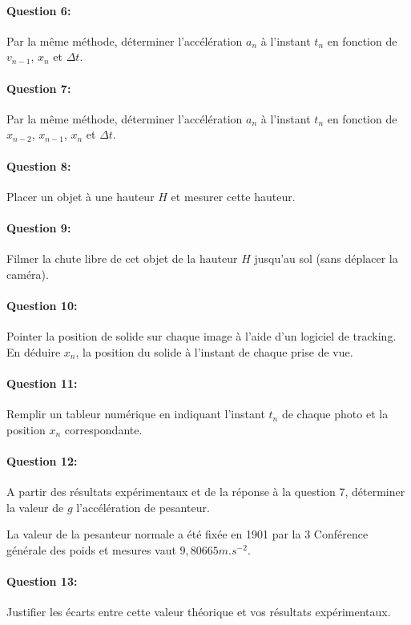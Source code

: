 \paragraph{Question 6:} Par la même méthode, déterminer l'accélération $a_n$ à l'instant $t_n$ en fonction de $v_{n-1}$, $x_n$ et $\Delta t$.

\paragraph{Question 7:} Par la même méthode, déterminer l'accélération $a_n$ à l'instant $t_n$ en fonction de $x_{n-2}$, $x_{n-1}$, $x_n$ et $\Delta t$.


\paragraph{Question 8:} Placer un objet à une hauteur $H$ et mesurer cette hauteur.

\paragraph{Question 9:} Filmer la chute libre de cet objet de la hauteur $H$ jusqu'au sol (sans déplacer la caméra).

\paragraph{Question 10:} Pointer la position de solide sur chaque image à l'aide d'un logiciel de tracking. En déduire $x_n$, la position du solide à l'instant de chaque prise de vue.

\paragraph{Question 11:} Remplir un tableur numérique en indiquant l'instant $t_n$ de chaque photo et la position $x_n$ correspondante.


\paragraph{Question 12:} A partir des résultats expérimentaux et de la réponse à la question 7, déterminer la valeur de $g$ l'accélération de pesanteur.

 La valeur de la pesanteur normale a été fixée en 1901 par la 3 Conférence générale des poids et mesures vaut $9,80665m.s^{-2}$.
 
\paragraph{Question 13:} Justifier les écarts entre cette valeur théorique et vos résultats expérimentaux.


